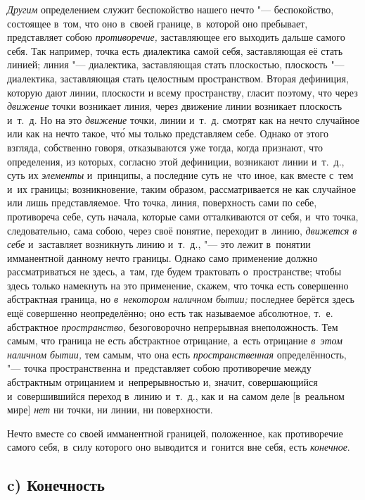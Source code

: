 {\em Другим} определением служит беспокойство нашего
нечто "--- беспокойство, состоящее в~том, что оно в~своей границе, в~которой
оно пребывает, представляет собою {\em противоречие,}
заставляющее его выходить дальше самого себя. Так например, точка есть
диалектика самой себя, заставляющая её стать линией; линия "--- диалектика,
заставляющая стать плоскостью, плоскость "--- диалектика, заставляющая стать
целостным пространством. Вторая дефиниция, которую дают линии, плоскости и
всему пространству, гласит поэтому, что через
{\em движение} точки возникает линия, через движение
линии возникает плоскость и~т.~д. Но на это
{\em движение} точки, линии и~т.~д. смотрят как на
нечто случайное или как на нечто такое, чт\'{о} мы только представляем себе.
Однако от этого взгляда, собственно говоря, отказываются уже тогда, когда
признают, что определения, из которых, согласно этой дефиниции, возникают
линии и~т.~д., суть их {\em элементы} и~принципы, а
последние суть не~что иное, как вместе с~тем и~их границы; возникновение,
таким образом, рассматривается не как случайное или лишь представляемое.
Что точка, линия, поверхность сами по себе, противореча себе, суть начала,
которые сами отталкиваются от себя, и~что точка, следовательно, сама собою,
через своё понятие, переходит в~линию, {\em движется в
себе} и~заставляет возникнуть линию и~т.~д., "--- это лежит в~понятии
имманентной данному нечто границы. Однако само применение должно
рассматриваться не здесь, а~там, где будем трактовать о~пространстве; чтобы
здесь только намекнуть на это применение, скажем, что точка есть совершенно
абстрактная граница, но {\em в~некотором наличном
бытии;} последнее берётся здесь ещё совершенно неопределённо; оно есть так
называемое абсолютное, т.~е. абстрактное
{\em пространство,} безоговорочно непрерывная
внеположность. Тем самым, что граница не есть абстрактное отрицание, а~есть
отрицание {\em в~этом наличном бытии,} тем самым, что
она есть {\em пространственная} определённость, "--- точка
пространственна и~представляет собою противоречие между абстрактным
отрицанием и~непрерывностью и, значит, совершающийся и~совершившийся
переход в~линию и~т.~д., как и~на самом деле [в~реальном мире]
{\em нет} ни точки, ни линии, ни поверхности.

Нечто вместе со своей имманентной границей, положенное, как противоречие
самого себя, в~силу которого оно выводится и~гонится вне себя, есть
{\em конечное}.

\subsection[c) Конечность]{c) Конечность}

